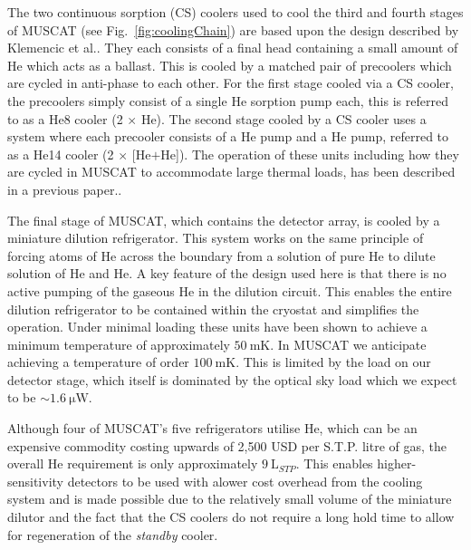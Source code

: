 \documentclass{spie}
\newcommand{\HeIII}{\ce{^{3}}He}
\newcommand{\HeIV}{\ce{^{4}}He}
\begin{document}
\par 
The two continuous sorption (CS) coolers used to cool the third and fourth stages of MUSCAT (see Fig.~\ref{fig:coolingChain}) are based upon the design described by Klemencic et al.\cite{Klemencic2016}. They each consists of a final head containing a small amount of \HeIII{} which acts as a ballast. This is cooled by a matched pair of precoolers which are cycled in anti-phase to each other. For the first stage cooled via a CS cooler, the precoolers simply consist of a single \HeIV{} sorption pump each, this is referred to as a He8 cooler (2 $\times$ \HeIV{}). The second stage cooled by a CS cooler uses a system where each precooler consists of a \HeIV{} pump and a \HeIII{} pump, referred to as a He14 cooler (2 $\times$ [\HeIV{}$+$\HeIII{}]). The operation of these units including how they are cycled in MUSCAT to accommodate large thermal loads, has been described in a previous paper.\cite{Brien2018}.
\par 
The final stage of MUSCAT, which contains the detector array, is cooled by a miniature dilution refrigerator. This system works on the same principle of forcing atoms of \HeIII{} across the boundary from a solution of pure \HeIII{} to dilute solution of \HeIV{} and \HeIII{}. A key feature of the design used here is that there is no active pumping of the gaseous \HeIII{} in the dilution circuit. This enables the entire dilution refrigerator to be contained within the cryostat and simplifies the operation. Under minimal loading these units have been shown to achieve a minimum temperature of approximately $50~\si{\milli\kelvin}$.\cite{Teleberg2008} In MUSCAT we anticipate achieving a temperature of order $100~\si{\milli\kelvin}$. This is limited by the load on our detector stage, which itself is dominated by the optical sky load which we expect to be $\sim 1.6~\si{\micro\watt}$.
\par 
Although four of MUSCAT's five refrigerators utilise \HeIII{}, which can be an expensive commodity costing upwards of 2,500 USD per S.T.P. litre of gas, the overall \HeIII{} requirement is only approximately $9~\si{\liter_{STP}}$. This enables higher-sensitivity detectors to be used with alower cost overhead from the cooling system and is made possible due to the relatively small volume of the miniature dilutor and the fact that the CS coolers do not require a long hold time to allow for regeneration of the \textit{standby} cooler. 
%
\end{document}
